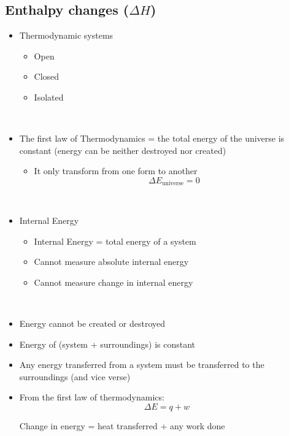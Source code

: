 \documentclass[11pt]{article}
\begin{document}
\subsection{Enthalpy changes ($\Delta H$)}
\begin{itemize}
    \item Thermodynamic systems
    \begin{itemize}
        \item Open
        \item Closed
        \item Isolated
    \end{itemize}
    \\

    \item The first law of Thermodynamics = the total energy of the universe is constant (energy can be neither destroyed nor created)
    \begin{itemize}
        \item It only transform from one form to another
        \begin{equation}
            \Delta E_{\text{universe}} = 0
        \end{equation}
    \end{itemize}
    \\
    
    \item Internal Energy
    \begin{itemize}
        \item Internal Energy = total energy of a system
        \item Cannot measure absolute internal energy
        \item Cannot measure change in internal energy
    \end{itemize}
    \\

    \item Energy cannot be created or destroyed
    \item Energy of (system + surroundings) is constant
    \item Any energy transferred from a system must be transferred to the surroundings (and vice verse)
    \item From the first law of thermodynamics:
    \begin{equation}
        \Delta E = q + w
    \end{equation}
    \begin{center}
        Change in energy = heat transferred + any work done
    \end{center}


\end{itemize}
\end{document}
